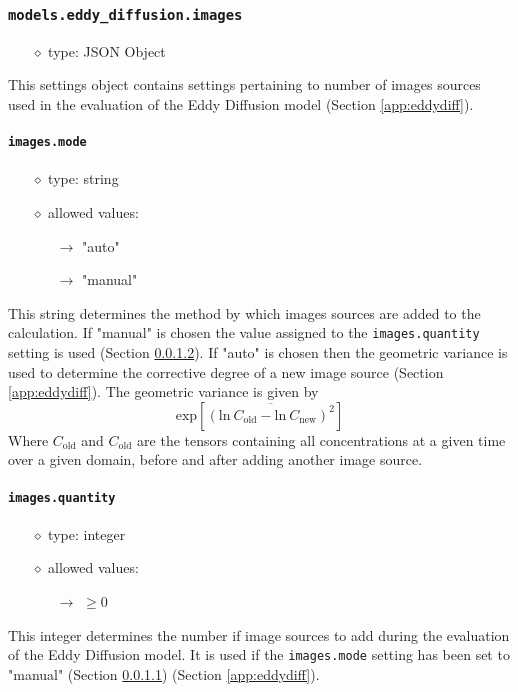 \documentclass[]{article}
\def\code#1{\texttt{#1}}
\begin{document}
\subsubsection{\code{models.eddy\_diffusion.images}}
\begin{itemize}
    \item[$\diamond$] type: JSON Object 
\end{itemize}
This settings object contains settings pertaining to number of images sources
used in the evaluation of the Eddy Diffusion model (Section \ref{app:eddydiff}).

\paragraph{\code{images.mode}}\label{sec:imagemode}
\begin{itemize}
    \item[$\diamond$] type: string 
    \item[$\diamond$] allowed values:
    \begin{itemize}
        \item[$\rightarrow$] "auto"
        \item[$\rightarrow$] "manual"
    \end{itemize}
\end{itemize}
This string determines the method by which images sources are added to the
calculation. If "manual" is chosen the value assigned to the
\code{images.quantity} setting  is used (Section
\ref{sec:imagequant}). If "auto" is chosen then the geometric variance is used
to determine the corrective degree of a new image source (Section
\ref{app:eddydiff}). The geometric variance is given by
\begin{equation}
    \text{exp}\left[\overline{\left(\text{ln}~C_{\text{old}}-\text{ln}~C_{\text{new}}\right)^{2}}\right]
\end{equation}
Where $C_{\text{old}}$ and $C_{\text{old}}$ are the tensors containing all
concentrations at a given time over a given domain, before and after adding
another image source.


\paragraph{\code{images.quantity}}\label{sec:imagequant}
\begin{itemize}
    \item[$\diamond$] type: integer 
    \item[$\diamond$] allowed values:
    \begin{itemize}
        \item[$\rightarrow$] $\geq 0$
    \end{itemize}
\end{itemize}
This integer determines the number if image sources to add during the evaluation
of the Eddy Diffusion model. It is used if the
\code{images.mode} setting has been set to "manual"
(Section \ref{sec:imagemode}) (Section \ref{app:eddydiff}).
\end{document}

